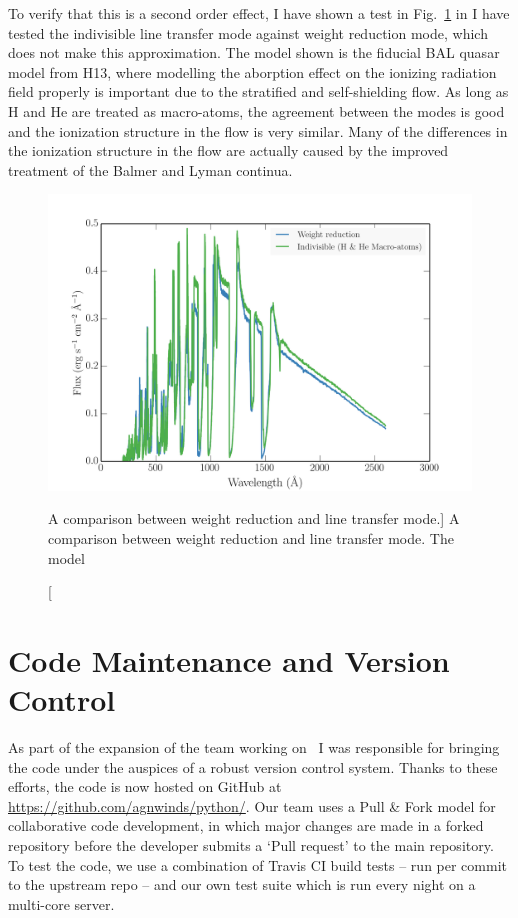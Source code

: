 To verify that this is a second order effect, 
I have shown a test in Fig.~\ref{fig:line_transfer} in I have tested the indivisible
line transfer mode against weight reduction mode, which does not make this 
approximation. The model shown is the fiducial BAL quasar model from
H13, where modelling the aborption effect on the ionizing radiation field 
properly is important due to the stratified
and self-shielding flow. As long as H and He are treated as macro-atoms, the agreement
between the modes is good and the ionization structure in the flow is very similar.
Many of the differences in the ionization structure in the flow are actually
caused by the improved treatment of the Balmer and Lyman continua.

\begin{figure}
\centering
\includegraphics[width=1.0\textwidth]{figures/03-radtrans/line_transfer_comparison.png}
\caption
[A comparison between weight reduction and line transfer mode.]
{
A comparison between weight reduction and line transfer mode. 
The model
} 
\label{fig:line_transfer}
\end{figure}

\section{Code Maintenance and Version Control}
\label{sec:code_maintenance}

As part of the expansion of the team working on \py\, I was responsible
for bringing the code under the auspices of a robust version control system.
Thanks to these efforts, the code is now hosted on GitHub at 
\url{https://github.com/agnwinds/python/}. Our team uses a Pull \& Fork model
for collaborative code development, in which major changes are made in a 
forked repository before the developer submits a `Pull request' to the main 
repository. To test the code, we use a combination of Travis CI build tests 
-- run per commit to the upstream repo -- and our own test suite which is 
run every night on a multi-core server. 


